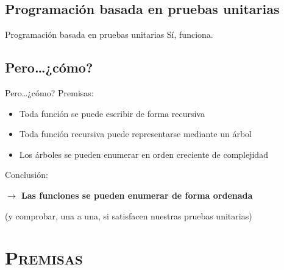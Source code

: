 \documentclass[xcolor=x11names,compress]{beamer}
\renewcommand{\(}{\begin{columns}}
\renewcommand{\)}{\end{columns}}
\newcommand{\<}[1]{\begin{column}{#1}}
\renewcommand{\>}{\end{column}}
\begin{document}
\subsection{Programación basada en pruebas unitarias}
\begin{frame}{Programación basada en pruebas unitarias}
    \pause
    \codeFactorialTarget \pause
    Sí, funciona.
\end{frame}


\subsection{Pero\ldots ¿cómo?}
\begin{frame}{Pero\ldots ¿cómo?}
    Premisas:
    \pause
    \begin{itemize}
        \item Toda función se puede escribir de forma recursiva \pause
        \item Toda función recursiva puede representarse mediante un árbol \pause
        \item Los árboles se pueden enumerar en orden creciente de complejidad \pause
    \end{itemize}
    Conclusión:

    \textbf{$\rightarrow$ Las funciones se pueden enumerar de forma ordenada} \pause

    (y comprobar, una a una, si satisfacen nuestras pruebas unitarias)
\end{frame}


\section{\scshape Premisas}
\end{document}

